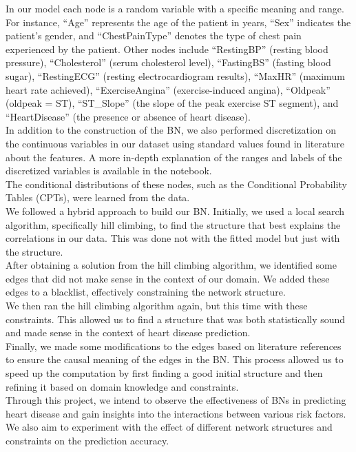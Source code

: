\documentclass[letterpaper]{article}
\begin{document}
In our model each node is a random variable with a specific meaning and range. For instance, “Age” represents the age of the patient in years, “Sex” indicates the patient’s gender, and “ChestPainType” denotes the type of chest pain experienced by the patient. Other nodes include “RestingBP” (resting blood pressure), “Cholesterol” (serum cholesterol level), “FastingBS” (fasting blood sugar), “RestingECG” (resting electrocardiogram results), “MaxHR” (maximum heart rate achieved), “ExerciseAngina” (exercise-induced angina), “Oldpeak” (oldpeak = ST), “ST\_Slope” (the slope of the peak exercise ST segment), and “HeartDisease” (the presence or absence of heart disease).\\
In addition to the construction of the BN, we also performed discretization on the continuous variables in our dataset using standard values found in literature about the features. A more in-depth explanation of the ranges and labels of the discretized variables is available in the notebook.\\
The conditional distributions of these nodes, such as the Conditional Probability Tables (CPTs), were learned from the data.\\
We followed a hybrid approach to build our BN. Initially, we used a local search algorithm, specifically hill climbing, to find the structure that best explains the correlations in our data. This was done not with the fitted model but just with the structure.\\
After obtaining a solution from the hill climbing algorithm, we identified some edges that did not make sense in the context of our domain. We added these edges to a blacklist, effectively constraining the network structure.\\
We then ran the hill climbing algorithm again, but this time with these constraints. This allowed us to find a structure that was both statistically sound and made sense in the context of heart disease prediction.\\
Finally, we made some modifications to the edges based on literature references to ensure the causal meaning of the edges in the BN. This process allowed us to speed up the computation by first finding a good initial structure and then refining it based on domain knowledge and constraints.\\
Through this project, we intend to observe the effectiveness of BNs in predicting heart disease and gain insights into the interactions between various risk factors. We also aim to experiment with the effect of different network structures and constraints on the prediction accuracy.
\end{document}

